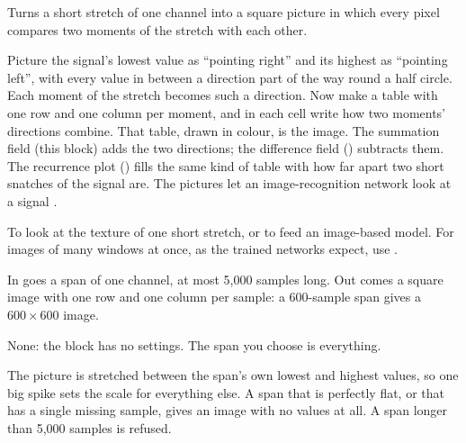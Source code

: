 Turns a short stretch of one channel into a square picture in which every pixel compares
two moments of the stretch with each other.

\begin{plainterms}
Picture the signal's lowest value as ``pointing right'' and its highest as ``pointing
left'', with every value in between a direction part of the way round a half circle. Each
moment of the stretch becomes such a direction. Now make a table with one row and one
column per moment, and in each cell write how two moments' directions combine. That table,
drawn in colour, is the image. The summation field (this block) adds the two directions; the
difference field () subtracts them. The recurrence plot
() fills the same kind of table with how far apart two
short snatches of the signal are. The pictures let an image-recognition network look at a
signal \citep{wang2015imaging}.
\end{plainterms}

To look at the texture of one short stretch, or to feed an image-based model. For images of
many windows at once, as the trained networks expect, use .

In goes a span of one channel, at most 5{,}000 samples long. Out comes a square image with
one row and one column per sample: a 600-sample span gives a $600 \times 600$ image.

None: the block has no settings. The span you choose is everything.

The picture is stretched between the span's own lowest and highest values, so one big spike
sets the scale for everything else. A span that is perfectly flat, or that has a single
missing sample, gives an image with no values at all. A span longer than 5{,}000 samples is
refused.
